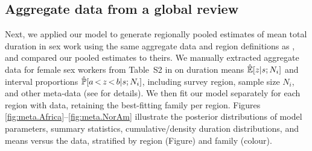 \subsection{Aggregate data from a global review}
Next, we applied our model to generate
regionally pooled estimates of mean total duration in sex work
using the same aggregate data and region definitions as \citet{Fazito2012},
and compared our pooled estimates to theirs.
We manually extracted aggregate data
for female sex workers from Table~S2 in \citep{Fazito2012}
on duration means $\hat{\mathbb{E}}[z|s;N_i]$ and interval proportions $\hat{\mathbb{P}}[a\,{<}\,z\,{<}\,b|s;N_i]$,
including survey region, sample size $N_i$, and other meta-data
(see  for details).
We then fit our model separately for each region with data,
retaining the best-fitting family per region.
Figures \ref{fig:meta.Africa}--\ref{fig:meta.NorAm} illustrate
the posterior distributions of model parameters, summary statistics,
cumulative/density duration distributions, and means versus the data,
stratified by region (Figure) and family (colour).
